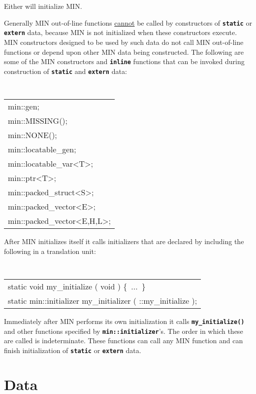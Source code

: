 \documentclass[12pt]{article}
\newcommand{\TT}[1]{{\tt \bfseries #1}}
\newcommand{\EOL}{\penalty \exhyphenpenalty}
\begin{document}
Either will initialize MIN.

Generally MIN out-of-line functions \underline{cannot} be called
by constructors of \TT{static} or \TT{extern} data, because
MIN is not initialized when these constructors execute.
MIN constructors designed to be used by such data do not call
MIN out-of-line functions or depend upon other MIN data being
constructed.  The following are some of the MIN constructors
and \TT{inline} functions that can be invoked during construction
of \TT{static} and \TT{extern} data:
\begin{center}
\tt
\begin{tabular}{l}
min::gen; \\
min::MISSING(); \\
min::NONE(); \\
min::locatable\_gen; \\
min::locatable\_var<T>; \\
min::ptr<T>; \\
min::packed\_struct<S>; \\
min::packed\_vector<E>; \\
min::packed\_vector<E,H,L>; \\
\end{tabular}
\end{center}

After MIN initializes itself it calls initializers that are
declared by including the following in a translation unit:

\begin{center}
\tt
\begin{tabular}{l}
static void my\_initialize ( void ) \{~...~\} \\
static min::initializer my\_initializer ( ::my\_initialize ); \\
\end{tabular}
\end{center}

Immediately after MIN performs its own initialization
it calls \TT{my\_initialize()} and other functions specified by
\TT{min::\EOL initializer}'s.  The order in which these
are called is indeterminate.  These functions can call any
MIN function and can finish initialization of \TT{static} or
\TT{extern} data.

\section{Data}
\end{document}
